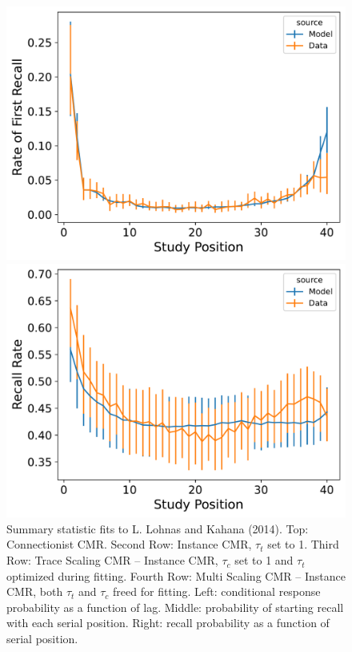 \documentclass[
  letterpaper,
  11pt,
  english,
  singlespacing,
  headsepline]{MastersDoctoralThesis}
\begin{document}
\begin{figure}
\begin{minipage}{0.33\linewidth}
\includegraphics{icmr_figures/LohnasKahana2014_MultiScalingCMR_Model_Fitting_pfr-1.png}\end{minipage}%
%
\begin{minipage}{0.33\linewidth}
\includegraphics{icmr_figures/LohnasKahana2014_MultiScalingCMR_Model_Fitting_spc-1.png}\end{minipage}%

\caption{\label{fig-lohnas2014memory}Summary statistic fits to L. Lohnas
and Kahana (2014). Top: Connectionist CMR. Second Row: Instance CMR,
\(\tau_{t}\) set to 1. Third Row: Trace Scaling CMR -- Instance CMR,
\(\tau_{c}\) set to 1 and \(\tau_{t}\) optimized during fitting. Fourth
Row: Multi Scaling CMR -- Instance CMR, both \(\tau_t\) and \(\tau_c\)
freed for fitting. Left: conditional response probability as a function
of lag. Middle: probability of starting recall with each serial
position. Right: recall probability as a function of serial position.}

\end{figure}%
\end{document}
